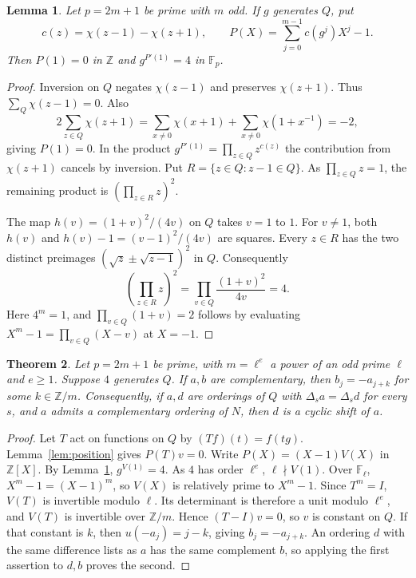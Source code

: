 \documentclass[11pt,a4paper]{article}
\newtheorem{theorem}{Theorem}[section]
\newtheorem{lemma}[theorem]{Lemma}
\numberwithin{equation}{section}
\begin{document}
\begin{lemma}\label{lem:product}
Let $p=2m+1$ be prime with $m$ odd. If $g$ generates $Q$, put
\[
c(z)=\chi(z-1)-\chi(z+1),\qquad
P(X)=\sum_{j=0}^{m-1}c(g^j)X^j-1 .
\]
Then $P(1)=0$ in $\mathbb Z$ and $g^{P'(1)}=4$ in $\mathbb F_p$.
\end{lemma}
\begin{proof}
Inversion on $Q$ negates $\chi(z-1)$ and preserves $\chi(z+1)$.
Thus $\sum_Q\chi(z-1)=0$. Also
\[
2\sum_{z\in Q}\chi(z+1)
=\sum_{x\ne0}\chi(x+1)+\sum_{x\ne0}\chi(1+x^{-1})=-2,
\]
giving $P(1)=0$.
In the product $g^{P'(1)}=\prod_{z\in Q}z^{c(z)}$ the contribution
from $\chi(z+1)$ cancels by inversion. Put $R=\{z\in Q:z-1\in Q\}$.
As $\prod_{z\in Q}z=1$, the remaining product is
$(\prod_{z\in R}z)^2$.

The map $h(v)=(1+v)^2/(4v)$ on $Q$ takes $v=1$ to $1$.
For $v\ne1$, both $h(v)$ and $h(v)-1=(v-1)^2/(4v)$ are squares.
Every $z\in R$ has the two distinct preimages
$(\sqrt z\pm\sqrt{z-1})^2$ in $Q$.
Consequently
\[
\left(\prod_{z\in R}z\right)^2
=\prod_{v\in Q}\frac{(1+v)^2}{4v}=4 .
\]
Here $4^m=1$, and $\prod_{v\in Q}(1+v)=2$ follows by evaluating
$X^m-1=\prod_{v\in Q}(X-v)$ at $X=-1$.
\end{proof}

\begin{theorem}\label{thm:rigidity}
Let $p=2m+1$ be prime, with $m=\ell^e$ a power of an odd prime $\ell$ and $e\ge1$. Suppose $4$ generates $Q$.
If $a,b$ are complementary, then $b_j=-a_{j+k}$ for some $k\in\mathbb Z/m$.
Consequently, if $a,d$ are orderings of $Q$ with $\Delta_s a=\Delta_s d$
for every $s$, and $a$ admits a complementary ordering of $N$, then
$d$ is a cyclic shift of $a$.
\end{theorem}
\begin{proof}
Let $T$ act on functions on $Q$ by $(Tf)(t)=f(tg)$. Lemma~\ref{lem:position}
gives $P(T)v=0$. Write $P(X)=(X-1)V(X)$ in $\mathbb Z[X]$.
By Lemma~\ref{lem:product}, $g^{V(1)}=4$. As $4$ has order $\ell^e$,
$\ell\nmid V(1)$. Over $\mathbb F_\ell$, $X^m-1=(X-1)^m$,
so $V(X)$ is relatively prime to $X^m-1$.
Since $T^m=I$, $V(T)$ is invertible modulo $\ell$.
Its determinant is therefore a unit modulo $\ell^e$, and $V(T)$ is
invertible over $\mathbb Z/m$. Hence $(T-I)v=0$, so $v$ is constant on $Q$.
If that constant is $k$, then $u(-a_j)=j-k$, giving $b_j=-a_{j+k}$.
An ordering $d$ with the same difference lists as $a$ has the same
complement $b$, so applying the first assertion to $d,b$ proves the second.
\end{proof}
\end{document}
